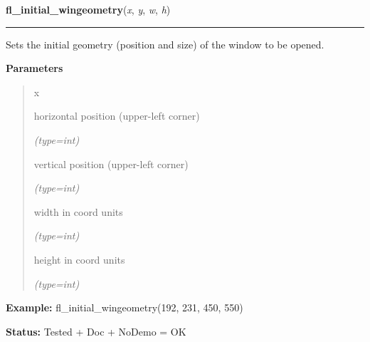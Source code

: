     \label{xformslib:flxbasic:fl_initial_wingeometry}

    \vspace{0.5ex}

\hspace{.8\funcindent}\begin{boxedminipage}{\funcwidth}

    \raggedright \textbf{fl\_initial\_wingeometry}(\textit{x}, \textit{y}, \textit{w}, \textit{h})

    \vspace{-1.5ex}

    \rule{\textwidth}{0.5\fboxrule}
\setlength{\parskip}{2ex}
    Sets the initial geometry (position and size) of the window to be 
    opened.

\setlength{\parskip}{1ex}
      \textbf{Parameters}
      \vspace{-1ex}

      \begin{quote}
        \begin{Ventry}{x}

          \item[x]

          horizontal position (upper-left corner)

            {\it (type=int)}

          \item[y]

          vertical position (upper-left corner)

            {\it (type=int)}

          \item[w]

          width in coord units

            {\it (type=int)}

          \item[h]

          height in coord units

            {\it (type=int)}

        \end{Ventry}

      \end{quote}

\textbf{Example:} fl\_initial\_wingeometry(192, 231, 450, 550)



\textbf{Status:} Tested + Doc + NoDemo = OK



    \end{boxedminipage}

